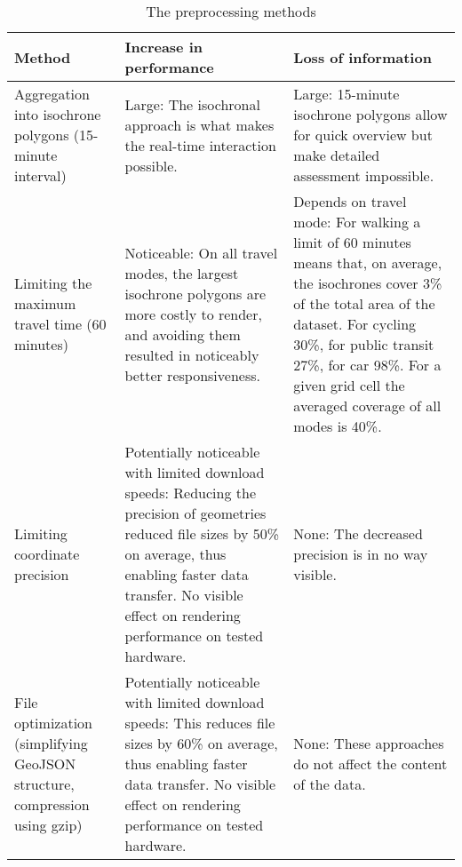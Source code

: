 \begin{table}[H]
	\caption{The preprocessing methods}
	\label{tab:preprocessing methods}
	\centering
	\begin{tabular}{ | L{0.21\textwidth} | L{0.35\textwidth} | L{0.35\textwidth} | }
		\hline
		\textbf{Method}
		& \textbf{Increase in performance}
		& \textbf{Loss of information}
		\\
		\hline
		\hline
		Aggregation into isochrone polygons (15-minute interval)
		& Large: The isochronal approach is what makes the real-time interaction possible.
		& Large: 15-minute isochrone polygons allow for quick overview but make detailed assessment impossible.
		\\
		\hline
		Limiting the maximum travel time (60 minutes)
		& Noticeable:
		On all travel modes, the largest isochrone polygons are more costly to render,
		and avoiding them resulted in noticeably better responsiveness.
		& Depends on travel mode:
		For walking a limit of 60 minutes means that, on average,
		the isochrones cover 3\% of the total area of the dataset.
		For cycling 30\%, for public transit 27\%, for car 98\%.
		For a given grid cell the averaged coverage of all modes is 40\%.
		\\
		\hline
		Limiting coordinate precision
		& Potentially noticeable with limited download speeds:
		Reducing the precision of geometries reduced file sizes by 50\% on average,
		thus enabling faster data transfer.
		No visible effect on rendering performance on tested hardware.
		& None: The decreased precision is in no way visible.
		\\
		\hline
		File optimization (simplifying GeoJSON structure, compression using gzip)
		& Potentially noticeable with limited download speeds:
		This reduces file sizes by 60\% on average,  %
		thus enabling faster data transfer.
		No visible effect on rendering performance on tested hardware.
		& None: These approaches do not affect the content of the data.
		\\
		\hline
	\end{tabular}
\end{table}
